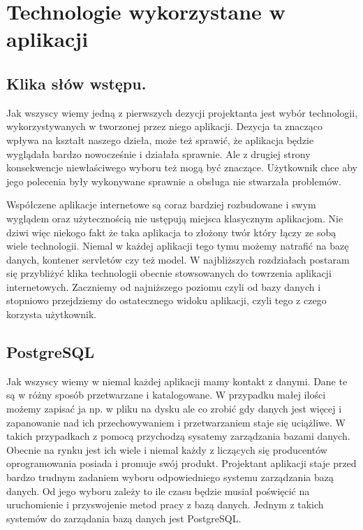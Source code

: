 

\section{Technologie wykorzystane w aplikacji}
\subsection{Klika słów wstępu.}
Jak wszyscy wiemy jedną z pierwszych dezycji projektanta jest wybór technologii, 
wykorzystywanych w tworzonej przez niego aplikacji. Dezycja ta znacząco wpływa na kształt naszego dzieła,
może też sprawić, że aplikacja będzie wyglądała bardzo nowocześnie i działała sprawnie. Ale z drugiej strony 
konsekwencje niewłaściwego wyboru też mogą być znaczące. Użytkownik chce aby jego polecenia były wykonywane
sprawnie a obsługa nie stwarzała problemów.

Współczene aplikacje internetowe są coraz bardziej rozbudowane i swym wyglądem oraz użytecznością nie ustępują
miejsca klasycznym aplikacjom. Nie dziwi więc niekogo fakt że taka aplikacja to złożony twór który łączy ze 
sobą wiele technologii. Niemal w każdej aplikacji tego tymu możemy natrafić na bazę danych, kontener servletów
czy też model. W najbliższych rozdziałach postaram się przybliżyć klika technologii obecnie stowsowanych do 
towrzenia aplikacji internetowych. Zaczniemy od najniższego poziomu czyli od bazy danych i stopniowo 
przejdziemy do ostatecznego widoku aplikacji, czyli tego z czego korzysta użytkownik.


\subsection{PostgreSQL}
Jak wszyscy wiemy w niemal każdej aplikacji mamy kontakt z danymi. Dane te są w różny sposób przetwarzane i 
katalogowane. W przypadku małej ilości możemy zapisać ja np. w pliku na dysku ale co zrobić gdy danych jest 
więcej i zapanowanie nad ich przechowywaniem i przetwarzaniem staje się uciążliwe. W takich przypadkach
z pomocą przychodzą sysatemy zarządzania bazami danych. Obecnie na rynku jest ich wiele i niemal każdy z liczących
się producentów oprogramowania posiada i promuje swój produkt. Projektant aplikacji staje przed bardzo trudnym 
zadaniem wyboru odpowiedniego systemu zarządzania bazą danych. Od jego wyboru zależy to ile czasu będzie musiał
poświęcić na uruchomienie i przyswojenie metod pracy z bazą danych. Jednym z takich systemów do zarządania bazą
danych jest PostgreSQL.

